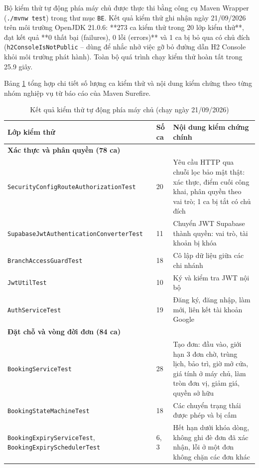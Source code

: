 Bộ kiểm thử tự động phía máy chủ được thực thi bằng công cụ Maven Wrapper (\texttt{./mvnw test}) trong thư mục \texttt{BE}. Kết quả kiểm thử ghi nhận ngày 21/09/2026 trên môi trường OpenJDK 21.0.6: **273 ca kiểm thử trong 20 lớp kiểm thử**, đạt kết quả **0 thất bại (failures), 0 lỗi (errors)** và 1 ca bị bỏ qua có chủ đích (\texttt{h2ConsoleIsNotPublic} -- dùng để nhắc nhở việc gỡ bỏ đường dẫn H2 Console khỏi môi trường phát hành). Toàn bộ quá trình chạy kiểm thử hoàn tất trong 25.9 giây.

Bảng \ref{tab:kt_be} tổng hợp chi tiết số lượng ca kiểm thử và nội dung kiểm chứng theo từng nhóm nghiệp vụ từ báo cáo của Maven Surefire.

\begin{table}[H]
\centering
\caption{Kết quả kiểm thử tự động phía máy chủ (chạy ngày 21/09/2026)}
\label{tab:kt_be}
\footnotesize
\renewcommand{\arraystretch}{1.2}
\begin{tabular}{|p{5.7cm}|p{1.1cm}|p{7.0cm}|}
\hline
\textbf{Lớp kiểm thử} & \textbf{Số ca} & \textbf{Nội dung kiểm chứng chính} \\
\hline
\multicolumn{3}{|l|}{\textbf{Xác thực và phân quyền (78 ca)}} \\
\hline
\texttt{SecurityConfigRoute\allowbreak AuthorizationTest} & 20 & Yêu cầu HTTP qua chuỗi lọc bảo mật thật: xác thực, điểm cuối công khai, phân quyền theo vai trò; 1 ca bị tắt có chủ đích \\
\hline
\texttt{SupabaseJwtAuthentication\allowbreak ConverterTest} & 11 & Chuyển JWT Supabase thành quyền: vai trò, tài khoản bị khóa \\
\hline
\texttt{BranchAccessGuardTest} & 18 & Cô lập dữ liệu giữa các chi nhánh \\
\hline
\texttt{JwtUtilTest} & 10 & Ký và kiểm tra JWT nội bộ \\
\hline
\texttt{AuthServiceTest} & 19 & Đăng ký, đăng nhập, làm mới, liên kết tài khoản Google \\
\hline
\multicolumn{3}{|l|}{\textbf{Đặt chỗ và vòng đời đơn (84 ca)}} \\
\hline
\texttt{BookingServiceTest} & 28 & Tạo đơn: đầu vào, giới hạn 3 đơn chờ, trùng lịch, bảo trì, giờ mở cửa, giá tính ở máy chủ, làm tròn đơn vị, giảm giá, quyền sở hữu \\
\hline
\texttt{BookingStateMachineTest} & 18 & Các chuyển trạng thái được phép và bị cấm \\
\hline
\texttt{BookingExpiryServiceTest}, \texttt{BookingExpiry\allowbreak SchedulerTest} & 6, 3 & Hết hạn dưới khóa dòng, không ghi đè đơn đã xác nhận, lỗi ở một đơn không chặn các đơn khác \\

\end{tabular}
\end{table}
